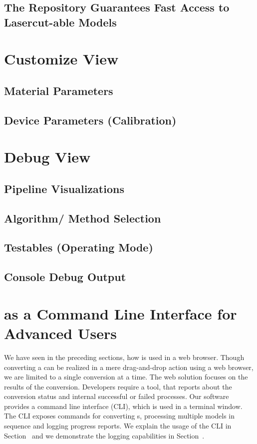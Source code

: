 \documentclass[../ClassicThesis.tex]{subfiles}
\begin{document}

\subsection{The Repository Guarantees Fast Access to Lasercut-able Models}


\section{Customize View}

\subsection{Material Parameters}
\subsection{Device Parameters (Calibration)}

\section{Debug View}

\subsection{Pipeline Visualizations}
\subsection{Algorithm/ Method Selection}
\subsection{Testables (Operating Mode)}
\subsection{Console Debug Output}

\section{{\platener} as a Command Line Interface for Advanced Users}
\label{sec:walkthrough-cli}

We have seen in the preceding sections, how {\platener} is used in a
web browser.
Though converting a {\threedmodel} can be realized in a mere
drag-and-drop action using a web browser, we are limited to a single
conversion at a time. The web solution focuses on the results of the
conversion. Developers require a tool, that reports about the
conversion status and internal successful or failed processes. Our
software {\platener} provides a command line interface (CLI), which is
used in a terminal window. The CLI exposes commands for converting
{\threedmodel}s, processing multiple models in sequence and logging
progress reports. We explain the usage of the CLI in
Section~ and we demonstrate the logging
capabilities in Section~.
\end{document}
